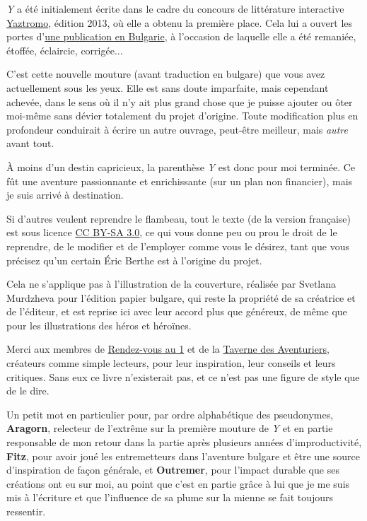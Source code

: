 \documentclass{report}
\begin{document}
\emph{Y} a été initialement écrite dans le cadre du concours de littérature interactive \href{http://litteraction.fr/presentation/livre-dont-on-est-le-heros/concours-yaztromo}{Yaztromo}, édition 2013, où elle a obtenu la première place. Cela lui a ouvert les portes d'\href{http://knigi-igri.bg/articles-reviews/articles-news/item/140-ochakvaite-geroi-na-erik-bert/140-ochakvaite-geroi-na-erik-bert}{une publication en Bulgarie}, à l'occasion de laquelle elle a été remaniée, étoffée, éclaircie, corrigée...

C'est cette nouvelle mouture (avant traduction en bulgare) que vous avez actuellement sous les yeux. Elle est sans doute imparfaite, mais cependant achevée, dans le sens où il n'y ait plus grand chose que je puisse ajouter ou ôter moi-même sans dévier totalement du projet d'origine. Toute modification plus en profondeur conduirait à écrire un autre ouvrage, peut-être meilleur, mais \emph{autre} avant tout.

À moins d'un destin capricieux, la parenthèse \emph{Y} est donc pour moi terminée. Ce fût une aventure passionnante et enrichissante (sur un plan non financier), mais je suis arrivé à destination.

Si d'autres veulent reprendre le flambeau, tout le texte (de la version française) est sous licence \href{http://creativecommons.org/licenses/by-sa/3.0/fr/}{CC BY-SA 3.0}, ce qui vous donne peu ou prou le droit de le reprendre, de le modifier et de l'employer comme vous le désirez, tant que vous précisez qu'un certain Éric Berthe est à l'origine du projet.

Cela ne s'applique pas à l'illustration de la couverture, réalisée par Svetlana Murdzheva pour l'édition papier bulgare, qui reste la propriété de sa créatrice et de l'éditeur, et est reprise ici avec leur accord plus que généreux, de même que pour les illustrations des héros et héroïnes.

Merci aux membres de \href{http://rdv1.dnsalias.net/forum/}{Rendez-vous au 1} et de la \href{http://www.la-taverne-des-aventuriers.com/forum}{Taverne des Aventuriers}, créateurs comme simple lecteurs, pour leur inspiration, leur conseils et leurs critiques. Sans eux ce livre n'existerait pas, et ce n'est pas une figure de style que de le dire.

Un petit mot en particulier pour, par ordre alphabétique des pseudonymes, \textbf{Aragorn}, relecteur de l'extrême sur la première mouture de \emph{Y} et en partie responsable de mon retour dans la partie après plusieurs années d'improductivité, \textbf{Fitz}, pour avoir joué les entremetteurs dans l'aventure bulgare et être une source d'inspiration de façon générale, et \textbf{Outremer}, pour l'impact durable que ses créations ont eu sur moi, au point que c'est en partie grâce à lui que je me suis mis à l'écriture et que l'influence de sa plume sur la mienne se fait toujours ressentir.
\end{document}
